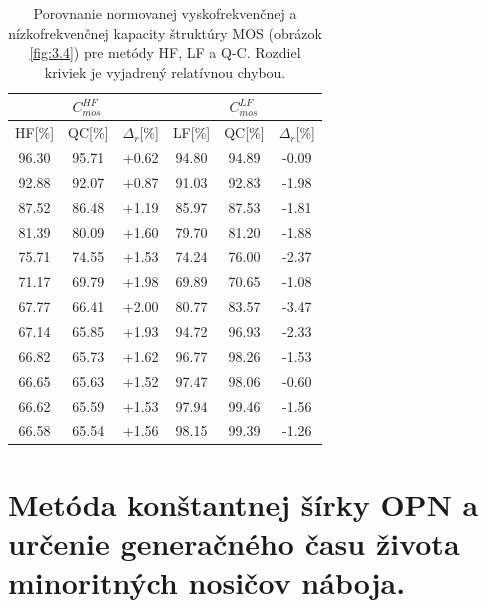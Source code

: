 \begin{table}[h!]\centering
\begin{tabular}{|c|c|c||c|c|c|}
  \hline
  \multicolumn{3}{|c||}{$C^{HF}_{mos}$} & \multicolumn{3}{|c|}{$C^{LF}_{mos}$} \\
  \hline
  HF[\%] & QC[\%] & $\Delta_r$[\%] & LF[\%] & QC[\%] & $\Delta_r$[\%] \\
  \hline
  96.30 & 95.71 & +0.62 & 94.80 & 94.89 & -0.09 \\
  92.88 & 92.07 & +0.87 & 91.03 & 92.83 & -1.98 \\
  87.52 & 86.48 & +1.19 & 85.97 & 87.53 & -1.81 \\
  81.39 & 80.09 & +1.60 & 79.70 & 81.20 & -1.88 \\
  75.71 & 74.55 & +1.53 & 74.24 & 76.00 & -2.37 \\
  71.17 & 69.79 & +1.98 & 69.89 & 70.65 & -1.08 \\
  67.77 & 66.41 & +2.00 & 80.77 & 83.57 & -3.47 \\
  67.14 & 65.85 & +1.93 & 94.72 & 96.93 & -2.33 \\
  66.82 & 65.73 & +1.62 & 96.77 & 98.26 & -1.53 \\
  66.65 & 65.63 & +1.52 & 97.47 & 98.06 & -0.60 \\
  66.62 & 65.59 & +1.53 & 97.94 & 99.46 & -1.56 \\
  66.58 & 65.54 & +1.56 & 98.15 & 99.39 & -1.26 \\
  \hline
\end{tabular}
\caption[Porovnanie normovanej vyskofrekvenčnej a
  nízkofrekvenčnej kapacity štruktúry MOS (obrázok \ref{fig:3.4}) pre
  metódy HF, LF a Q-C]{Porovnanie normovanej vyskofrekvenčnej a
  nízkofrekvenčnej kapacity štruktúry MOS (obrázok \ref{fig:3.4}) pre
  metódy HF, LF a Q-C. Rozdiel kriviek je vyjadrený relatívnou
  chybou.}
\label{tab:3.2}
\end{table}


\section{Metóda konštantnej šírky OPN a určenie generačného času života minoritných nosičov náboja.}\label{sec:3.4}

